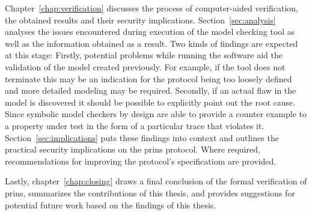 Chapter~\ref{chap:verification} discusses the process of computer-aided verification, the obtained results and their security implications.
Section~\ref{sec:analysis} analyses the issues encountered during execution of the model checking tool as well as the information obtained as a result.
Two kinds of findings are expected at this stage:
Firstly, potential problems while running the software aid the validation of the model created previously.
For example, if the tool does not terminate this may be an indication for the protocol being too loosely defined and more detailed modeling may be required.
Secondly, if an actual flaw in the model is discovered it should be possible to explicitly point out the root cause.
Since symbolic model checkers by design are able to provide a counter example to a property under test in the form of a particular trace that violates it.
Section~\ref{sec:implications} puts these findings into context and outlines the practical security implications on the \gls{prins} protocol.
Where required, recommendations for improving the protocol's specificatiom are provided.

Lastly, chapter~\ref{chap:closing} draws a final conclusion of the formal verification of \gls{prins}, summarizes the contributions of this thesis, and provides suggestions for potential future work based on the findings of this thesis.
